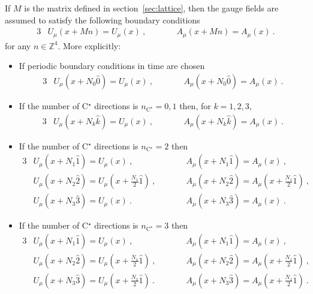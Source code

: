 \documentclass[11pt,fleqn]{article}
\begin{document}
If $M$ is the matrix defined in section~\ref{sec:lattice}, then the gauge fields are assumed to satisfy the following boundary conditions
\begin{alignat}{3}
   & U_\mu(x + M n) = U_\mu(x) \ ,
   & \qquad &
   A_\mu(x + M n) = A_\mu(x) \ .
\end{alignat}
for any $n \in \mathbb{Z}^4$. More explicitly:
\begin{itemize}[nolistsep,noitemsep]
   \item If periodic boundary conditions in time are chosen
   \begin{alignat}{3}
      & U_\mu(x + N_0 \hat{0}) = U_\mu(x) \ ,
      & \qquad &
      A_\mu(x + N_0 \hat{0}) = A_\mu(x) \ .
   \end{alignat}
   \item If the number of C$^\star$ directions is $n_{\text{C}^\star}=0,1$ then, for $k=1,2,3$,
   \begin{alignat}{3}
      & U_\mu(x + N_k \hat{k}) = U_\mu(x) \ ,
      & \qquad &
      A_\mu(x + N_k \hat{k}) = A_\mu(x) \ .
   \end{alignat}
   \item If the number of C$^\star$ directions is $n_{\text{C}^\star}=2$ then
   \begin{alignat}{3}
      & U_\mu(x + N_1 \hat{1}) = U_\mu(x) \ ,
      & \qquad &
      A_\mu(x + N_1 \hat{1}) = A_\mu(x) \ , \\
      & U_\mu(x + N_2 \hat{2}) = U_\mu(x + \tfrac{N_1}{2} \hat{1}) \ ,
      & \qquad &
      A_\mu(x + N_2 \hat{2}) = A_\mu(x + \tfrac{N_1}{2} \hat{1}) \ , \\
      & U_\mu(x + N_3 \hat{3}) = U_\mu(x) \ .
      & \qquad &
      A_\mu(x + N_3 \hat{3}) = A_\mu(x) \ .
   \end{alignat}
   \item If the number of C$^\star$ directions is $n_{\text{C}^\star}=3$ then
   \begin{alignat}{3}
      & U_\mu(x + N_1 \hat{1}) = U_\mu(x) \ ,
      & \qquad &
      A_\mu(x + N_1 \hat{1}) = A_\mu(x) \ , \\
      & U_\mu(x + N_2 \hat{2}) = U_\mu(x + \tfrac{N_1}{2} \hat{1}) \ ,
      & \qquad &
      A_\mu(x + N_2 \hat{2}) = A_\mu(x + \tfrac{N_1}{2} \hat{1}) \ , \\
      & U_\mu(x + N_3 \hat{3}) = U_\mu(x + \tfrac{N_1}{2} \hat{1}) \ .
      & \qquad &
      A_\mu(x + N_3 \hat{3}) = A_\mu(x + \tfrac{N_1}{2} \hat{1}) \ .
   \end{alignat}
\end{itemize}
   
\end{document}
